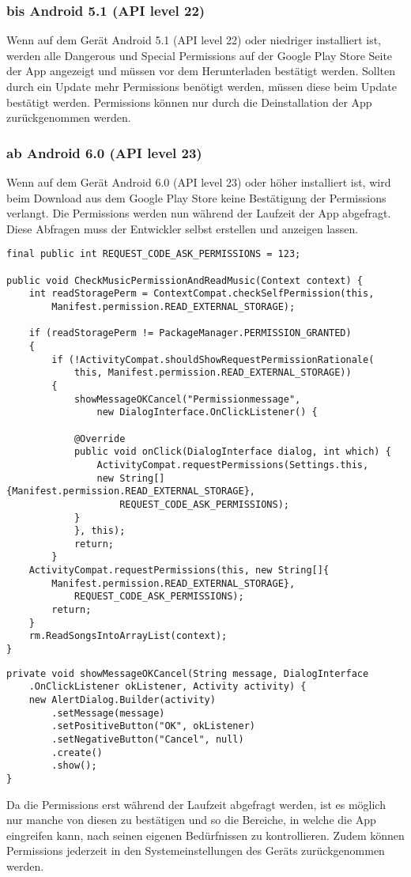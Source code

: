 \documentclass[FIPLY_base.tex]{subfiles}
\begin{document}
\newpage
\subsubsection{bis Android 5.1 (API level 22)}
Wenn auf dem Gerät Android 5.1 (API level 22) oder niedriger installiert ist, werden alle Dangerous und Special Permissions auf der Google Play Store Seite der App angezeigt 
und müssen vor dem Herunterladen bestätigt werden. 
Sollten durch ein Update mehr Permissions benötigt werden, müssen diese beim Update bestätigt werden. 
Permissions können nur durch die Deinstallation der App zurückgenommen werden.

\subsubsection{ab Android 6.0 (API level 23)}
Wenn auf dem Gerät Android 6.0 (API level 23) oder höher installiert ist, wird beim Download aus dem Google Play Store keine Bestätigung der Permissions verlangt.
Die Permissions werden nun während der Laufzeit der App abgefragt. Diese Abfragen muss der Entwickler selbst erstellen und anzeigen lassen.

\begin{lstlisting}
final public int REQUEST_CODE_ASK_PERMISSIONS = 123;

public void CheckMusicPermissionAndReadMusic(Context context) {
	int readStoragePerm = ContextCompat.checkSelfPermission(this, 
		Manifest.permission.READ_EXTERNAL_STORAGE);

	if (readStoragePerm != PackageManager.PERMISSION_GRANTED) 
	{
		if (!ActivityCompat.shouldShowRequestPermissionRationale(
			this, Manifest.permission.READ_EXTERNAL_STORAGE)) 
		{
			showMessageOKCancel("Permissionmessage", 
				new DialogInterface.OnClickListener() {
				
			@Override
			public void onClick(DialogInterface dialog, int which) {
				ActivityCompat.requestPermissions(Settings.this,
				new String[]{Manifest.permission.READ_EXTERNAL_STORAGE},
					REQUEST_CODE_ASK_PERMISSIONS);
			}
			}, this);
			return;
		}
	ActivityCompat.requestPermissions(this, new String[]{
		Manifest.permission.READ_EXTERNAL_STORAGE}, 
			REQUEST_CODE_ASK_PERMISSIONS);
		return;
	}
	rm.ReadSongsIntoArrayList(context);
}
\end{lstlisting}

\begin{lstlisting}
private void showMessageOKCancel(String message, DialogInterface
	.OnClickListener okListener, Activity activity) {
	new AlertDialog.Builder(activity)
		.setMessage(message)
		.setPositiveButton("OK", okListener)
		.setNegativeButton("Cancel", null)
		.create()
		.show();
}
\end{lstlisting}
Da die Permissions erst während der Laufzeit abgefragt werden, ist es möglich nur manche von diesen zu bestätigen und so die Bereiche, in welche die App eingreifen kann, nach seinen eigenen Bedürfnissen zu kontrollieren.
Zudem können Permissions jederzeit in den Systemeinstellungen des Geräts zurückgenommen werden.
\end{document}
